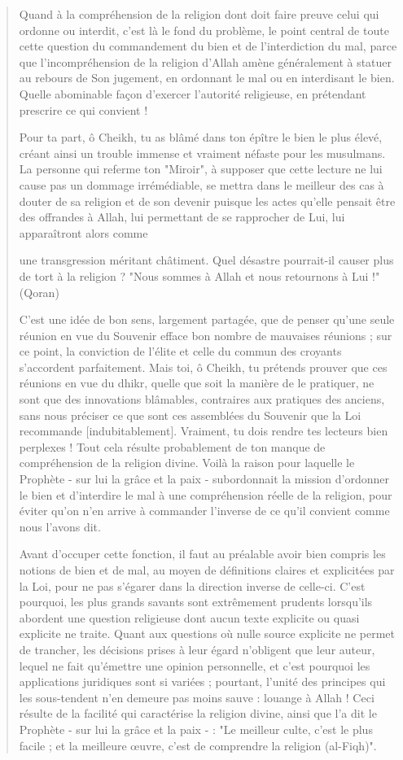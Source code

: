 \begin{quote}
Quand à la compréhension de la religion dont doit faire preuve celui qui
ordonne ou interdit, c'est là le fond du problème, le point central de
toute cette question du commandement du bien et de l'interdiction du
mal, parce que l'incompréhension de la religion d'Allah amène
généralement à statuer au rebours de Son jugement, en ordonnant le mal
ou en interdisant le bien. Quelle abominable façon d'exercer l'autorité
religieuse, en prétendant prescrire ce qui convient !

Pour ta part, ô Cheikh, tu as blâmé dans ton épître le bien le plus
élevé, créant ainsi un trouble immense et vraiment néfaste pour les
musulmans. La personne qui referme ton "Miroir", à supposer que cette
lecture ne lui cause pas un dommage irrémédiable, se mettra dans le
meilleur des cas à douter de sa religion et de son devenir puisque les
actes qu'elle pensait être des offrandes à Allah, lui permettant de se
rapprocher de Lui, lui apparaîtront alors comme

une transgression méritant châtiment. Quel désastre pourrait-il causer
plus de tort à la religion ? "Nous sommes à Allah et nous retournons à
Lui !" (Qoran)

C'est une idée de bon sens, largement partagée, que de penser qu'une
seule réunion en vue du Souvenir efface bon nombre de mauvaises réunions
; sur ce point, la conviction de l'élite et celle du commun des croyants
s'accordent parfaitement. Mais toi, ô Cheikh, tu prétends prouver que
ces réunions en vue du dhikr, quelle que soit la manière de le
pratiquer, ne sont que des innovations blâmables, contraires aux
pratiques des anciens, sans nous préciser ce que sont ces assemblées du
Souvenir que la Loi recommande {[}indubitablement{]}. Vraiment, tu dois
rendre tes lecteurs bien perplexes ! Tout cela résulte probablement de
ton manque de compréhension de la religion divine. Voilà la raison pour
laquelle le Prophète - sur lui la grâce et la paix - subordonnait la
mission d'ordonner le bien et d'interdire le mal à une compréhension
réelle de la religion, pour éviter qu'on n'en arrive à commander
l'inverse de ce qu'il convient comme nous l'avons dit.

Avant d'occuper cette fonction, il faut au préalable avoir bien compris
les notions de bien et de mal, au moyen de définitions claires et
explicitées par la Loi, pour ne pas s'égarer dans la direction inverse
de celle-ci. C'est pourquoi, les plus grands savants sont extrêmement
prudents lorsqu'ils abordent une question religieuse dont aucun texte
explicite ou quasi explicite ne traite. Quant aux questions où nulle
source explicite ne permet de trancher, les décisions prises à leur
égard n'obligent que leur auteur, lequel ne fait qu'émettre une opinion
personnelle, et c'est pourquoi les applications juridiques sont si
variées ; pourtant, l'unité des principes qui les sous-tendent n'en
demeure pas moins sauve : louange à Allah ! Ceci résulte de la facilité
qui caractérise la religion divine, ainsi que l'a dit le Prophète - sur
lui la grâce et la paix - : "Le meilleur culte, c'est le plus facile ;
et la meilleure œuvre, c'est de comprendre la religion (al-Fiqh)".


\end{quote}

